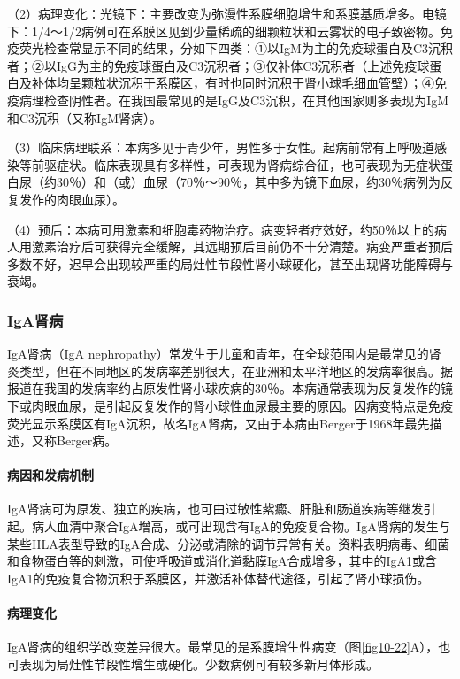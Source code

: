 （2）病理变化：光镜下：主要改变为弥漫性系膜细胞增生和系膜基质增多。电镜下：1/4～1/2病例可在系膜区见到少量稀疏的细颗粒状和云雾状的电子致密物。免疫荧光检查常显示不同的结果，分如下四类：①以IgM为主的免疫球蛋白及C3沉积者；②以IgG为主的免疫球蛋白及C3沉积者；③仅补体C3沉积者（上述免疫球蛋白及补体均呈颗粒状沉积于系膜区，有时也同时沉积于肾小球毛细血管壁）；④免疫病理检查阴性者。在我国最常见的是IgG及C3沉积，在其他国家则多表现为IgM和C3沉积（又称IgM肾病）。

（3）临床病理联系：本病多见于青少年，男性多于女性。起病前常有上呼吸道感染等前驱症状。临床表现具有多样性，可表现为肾病综合征，也可表现为无症状蛋白尿（约30％）和（或）血尿（70％～90％，其中多为镜下血尿，约30％病例为反复发作的肉眼血尿）。

（4）预后：本病可用激素和细胞毒药物治疗。病变轻者疗效好，约50％以上的病人用激素治疗后可获得完全缓解，其远期预后目前仍不十分清楚。病变严重者预后多数不好，迟早会出现较严重的局灶性节段性肾小球硬化，甚至出现肾功能障碍与衰竭。

\subsubsection{IgA肾病}

IgA肾病（IgA
nephropathy）常发生于儿童和青年，在全球范围内是最常见的肾炎类型，但在不同地区的发病率差别很大，在亚洲和太平洋地区的发病率很高。据报道在我国的发病率约占原发性肾小球疾病的30％。本病通常表现为反复发作的镜下或肉眼血尿，是引起反复发作的肾小球性血尿最主要的原因。因病变特点是免疫荧光显示系膜区有IgA沉积，故名IgA肾病，又由于本病由Berger于1968年最先描述，又称Berger病。

\paragraph{病因和发病机制}
IgA肾病可为原发、独立的疾病，也可由过敏性紫癜、肝脏和肠道疾病等继发引起。病人血清中聚合IgA增高，或可出现含有IgA的免疫复合物。IgA肾病的发生与某些HLA表型导致的IgA合成、分泌或清除的调节异常有关。资料表明病毒、细菌和食物蛋白等的刺激，可使呼吸道或消化道黏膜IgA合成增多，其中的IgA1或含IgA1的免疫复合物沉积于系膜区，并激活补体替代途径，引起了肾小球损伤。

\paragraph{病理变化}
IgA肾病的组织学改变差异很大。最常见的是系膜增生性病变（图\ref{fig10-22}A），也可表现为局灶性节段性增生或硬化。少数病例可有较多新月体形成。

